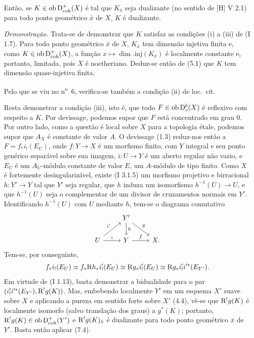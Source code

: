 Então, se $K\in\operatorname{ob}\mathrm{D}^{+}_{\mathrm{coh}}(X)$ é tal que $K_{\bar{x}}$ seja dualizante (no sentido de [H] V 2.1) para todo ponto geométrico $\bar{x}$ de $X$, $K$ é dualizante.

\emph{Demonstração.} Trata-se de demonstrar que $K$ satisfaz as condições (i) a (iii) de (I 1.7). Para todo ponto geométrico $\bar{x}$ de $X$, $K_{\bar{x}}$ tem dimensão injetiva finita e, como $K\in\operatorname{ob}\mathrm{D}^{+}_{\mathrm{coh}}(X)$, a função $x\mapsto \dim.\mathrm{inj}(K_{\bar{x}})$ é localmente constante e, portanto, limitada, pois $X$ é noetheriano. Deduz-se então de (5.1) que $K$ tem dimensão quase-injetiva finita.

Pelo que se viu no n\textsuperscript{o}~6, verifica-se também a condição (ii) de loc.~cit.

Resta demonstrar a condição (iii), isto é, que todo $F\in\operatorname{ob}\mathrm{D}_c^b(X)$ é reflexivo com respeito a $K$. Por devissage, podemos supor que $F$ está concentrado em grau $0$. Por outro lado, como a questão é local sobre $X$ para a topologia étale, podemos supor que $A_X$ é constante de valor $A$. O devissage (1.3) reduz-nos então a $F=f_*i_!(E_U)$, onde $f:Y\to X$ é um morfismo finito, com $Y$ integral e seu ponto genérico separável sobre sua imagem, $i:U\to Y$ é um aberto regular não vazio, e $E_U$ é um $A_U$-módulo constante de valor $E$, um $A$-módulo de tipo finito. Como $X$ é fortemente desingularizável, existe (I 3.1.5) um morfismo projetivo e birracional $h:Y'\to Y$ tal que $Y'$ seja regular, que $h$ induza um isomorfismo $h^{-1}(U)\to U$, e que $h^{-1}(U)$ seja o complementar de um divisor de cruzamentos normais em $Y'$. Identificando $h^{-1}(U)$ com $U$ mediante $h$, tem-se o diagrama comutativo
\[
\begin{tikzcd}
& Y' \arrow[d,"h"] \arrow[dr,"g"] & \\
U \arrow[ur,"i'"] \arrow[r,"i"] & Y \arrow[r,"f"] & X.
\end{tikzcd}
\]
Tem-se, por conseguinte,
\[
        f_*i_!(E_U)\simeq f_*\mathrm{R} h_* i'_!(E_U)\simeq \mathrm{R} g_* i'_!(E_U)\simeq \mathrm{R} g_* i'_! i'^*(E_{Y'}).
\]
Em virtude de (I 1.13), basta demonstrar a bidualidade para o par $(i'_!i'^*(E_{Y'}),\mathrm{R} ^!g(K))$. Mas, embebendo localmente $Y'$ em um esquema $X'$ suave sobre $X$ e aplicando a pureza em sentido forte sobre $X'$ (4.4), vê-se que $\mathrm{R} ^!g(K)$ é localmente isomorfo (salvo translação dos graus) a $g^*(K)$; portanto, $\mathrm{R} ^!g(K)\in\operatorname{ob}\mathrm{D}^{+}_{\mathrm{coh}}(Y')$ e $\mathrm{R} ^!g(K)_{\bar{x}}$ é dualizante para todo ponto geométrico $\bar{x}$ de $Y'$. Basta então aplicar (7.4).

